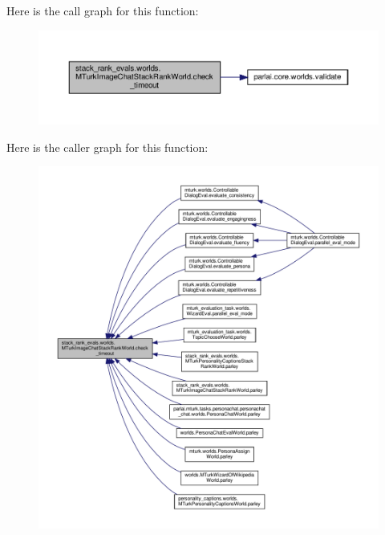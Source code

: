 Here is the call graph for this function\+:
\nopagebreak
\begin{figure}[H]
\begin{center}
\leavevmode
\includegraphics[width=350pt]{classstack__rank__evals_1_1worlds_1_1MTurkImageChatStackRankWorld_a9c6f889227e1aec6ad1dbaa4150b1625_cgraph}
\end{center}
\end{figure}
Here is the caller graph for this function\+:
\nopagebreak
\begin{figure}[H]
\begin{center}
\leavevmode
\includegraphics[width=350pt]{classstack__rank__evals_1_1worlds_1_1MTurkImageChatStackRankWorld_a9c6f889227e1aec6ad1dbaa4150b1625_icgraph}
\end{center}
\end{figure}
\mbox{\label{classstack__rank__evals_1_1worlds_1_1MTurkImageChatStackRankWorld_a518e69078a38528380731c4f1aa32149}} 
